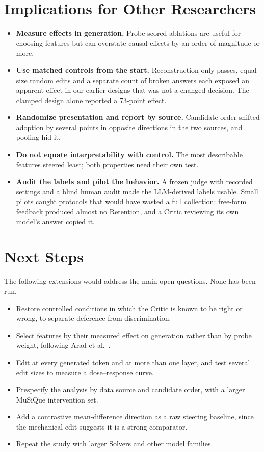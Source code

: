 \section{Implications for Other Researchers}

\begin{itemize}
    \item \textbf{Measure effects in generation.} Probe-scored ablations are
    useful for choosing features but can overstate causal effects by an order
    of magnitude or more.
    \item \textbf{Use matched controls from the start.} Reconstruction-only
    passes, equal-size random edits and a separate count of broken answers
    each exposed an apparent effect in our earlier designs that was not a
    changed decision. The clamped design alone reported a 73-point effect.
    \item \textbf{Randomize presentation and report by source.} Candidate
    order shifted adoption by several points in opposite directions in the two
    sources, and pooling hid it.
    \item \textbf{Do not equate interpretability with control.} The most
    describable features steered least; both properties need their own test.
    \item \textbf{Audit the labels and pilot the behavior.} A frozen judge
    with recorded settings and a blind human audit made the LLM-derived labels
    usable. Small pilots caught protocols that would have wasted a full
    collection: free-form feedback produced almost no Retention, and a Critic
    reviewing its own model's answer copied it.
\end{itemize}

\section{Next Steps}

The following extensions would address the main open questions. None has
been run.

\begin{itemize}
    \item Restore controlled conditions in which the Critic is known to be
    right or wrong, to separate deference from discrimination.
    \item Select features by their measured effect on generation rather than
    by probe weight, following Arad et al.\ \cite{arad2025steering}.
    \item Edit at every generated token and at more than one layer, and test
    several edit sizes to measure a dose--response curve.
    \item Prespecify the analysis by data source and candidate order, with a
    larger MuSiQue intervention set.
    \item Add a contrastive mean-difference direction as a raw steering
    baseline, since the mechanical edit suggests it is a strong comparator.
    \item Repeat the study with larger Solvers and other model families.
\end{itemize}
